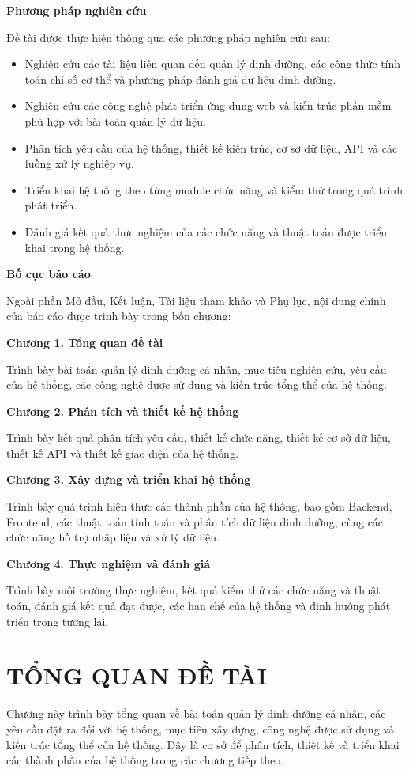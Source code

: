 \documentclass[12pt, a4paper]{report}
\begin{document}
\textbf{Phương pháp nghiên cứu}

Đề tài được thực hiện thông qua các phương pháp nghiên cứu sau:

\begin{itemize}
\item Nghiên cứu các tài liệu liên quan đến quản lý dinh dưỡng, các công thức tính toán chỉ số cơ thể và phương pháp đánh giá dữ liệu dinh dưỡng.
\item Nghiên cứu các công nghệ phát triển ứng dụng web và kiến trúc phần mềm phù hợp với bài toán quản lý dữ liệu.
\item Phân tích yêu cầu của hệ thống, thiết kế kiến trúc, cơ sở dữ liệu, API và các luồng xử lý nghiệp vụ.
\item Triển khai hệ thống theo từng module chức năng và kiểm thử trong quá trình phát triển.
\item Đánh giá kết quả thực nghiệm của các chức năng và thuật toán được triển khai trong hệ thống.
\end{itemize}
\textbf{Bố cục báo cáo}

Ngoài phần Mở đầu, Kết luận, Tài liệu tham khảo và Phụ lục, nội dung chính của báo cáo được trình bày trong bốn chương:

\textbf{Chương 1. Tổng quan đề tài}

Trình bày bài toán quản lý dinh dưỡng cá nhân, mục tiêu nghiên cứu, yêu cầu của hệ thống, các công nghệ được sử dụng và kiến trúc tổng thể của hệ thống.

\textbf{Chương 2. Phân tích và thiết kế hệ thống}

Trình bày kết quả phân tích yêu cầu, thiết kế chức năng, thiết kế cơ sở dữ liệu, thiết kế API và thiết kế giao diện của hệ thống.

\textbf{Chương 3. Xây dựng và triển khai hệ thống}

Trình bày quá trình hiện thực các thành phần của hệ thống, bao gồm Backend, Frontend, các thuật toán tính toán và phân tích dữ liệu dinh dưỡng, cùng các chức năng hỗ trợ nhập liệu và xử lý dữ liệu.

\textbf{Chương 4. Thực nghiệm và đánh giá}

Trình bày môi trường thực nghiệm, kết quả kiểm thử các chức năng và thuật toán, đánh giá kết quả đạt được, các hạn chế của hệ thống và định hướng phát triển trong tương lai.


\chapter{TỔNG QUAN ĐỀ TÀI}
Chương này trình bày tổng quan về bài toán quản lý dinh dưỡng cá nhân, các yêu cầu đặt ra đối với hệ thống, mục tiêu xây dựng, công nghệ được sử dụng và kiến trúc tổng thể của hệ thống. Đây là cơ sở để phân tích, thiết kế và triển khai các thành phần của hệ thống trong các chương tiếp theo.
\end{document}
